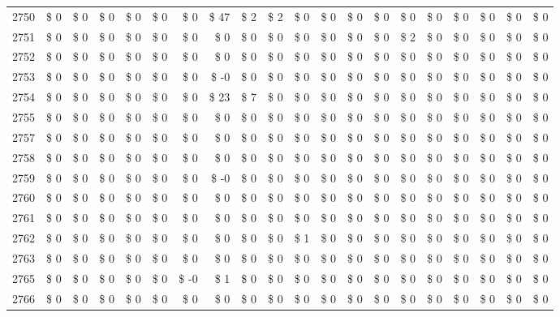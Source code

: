 \begin{longtable}{lrrrrrrrrrrrrrrrrrrr}
2750 & \$ 0 & \$ 0 & \$ 0 & \$ 0 & \$ 0 & \$ 0 & \$ 47 & \$ 2 & \$ 2 & \$ 0 & \$ 0 & \$ 0 & \$ 0 & \$ 0 & \$ 0 & \$ 0 & \$ 0 & \$ 0 & \$ 0 \\
2751 & \$ 0 & \$ 0 & \$ 0 & \$ 0 & \$ 0 & \$ 0 & \$ 0 & \$ 0 & \$ 0 & \$ 0 & \$ 0 & \$ 0 & \$ 0 & \$ 2 & \$ 0 & \$ 0 & \$ 0 & \$ 0 & \$ 0 \\
2752 & \$ 0 & \$ 0 & \$ 0 & \$ 0 & \$ 0 & \$ 0 & \$ 0 & \$ 0 & \$ 0 & \$ 0 & \$ 0 & \$ 0 & \$ 0 & \$ 0 & \$ 0 & \$ 0 & \$ 0 & \$ 0 & \$ 0 \\
2753 & \$ 0 & \$ 0 & \$ 0 & \$ 0 & \$ 0 & \$ 0 & \$ -0 & \$ 0 & \$ 0 & \$ 0 & \$ 0 & \$ 0 & \$ 0 & \$ 0 & \$ 0 & \$ 0 & \$ 0 & \$ 0 & \$ 0 \\
2754 & \$ 0 & \$ 0 & \$ 0 & \$ 0 & \$ 0 & \$ 0 & \$ 23 & \$ 7 & \$ 0 & \$ 0 & \$ 0 & \$ 0 & \$ 0 & \$ 0 & \$ 0 & \$ 0 & \$ 0 & \$ 0 & \$ 0 \\
2755 & \$ 0 & \$ 0 & \$ 0 & \$ 0 & \$ 0 & \$ 0 & \$ 0 & \$ 0 & \$ 0 & \$ 0 & \$ 0 & \$ 0 & \$ 0 & \$ 0 & \$ 0 & \$ 0 & \$ 0 & \$ 0 & \$ 0 \\
2757 & \$ 0 & \$ 0 & \$ 0 & \$ 0 & \$ 0 & \$ 0 & \$ 0 & \$ 0 & \$ 0 & \$ 0 & \$ 0 & \$ 0 & \$ 0 & \$ 0 & \$ 0 & \$ 0 & \$ 0 & \$ 0 & \$ 0 \\
2758 & \$ 0 & \$ 0 & \$ 0 & \$ 0 & \$ 0 & \$ 0 & \$ 0 & \$ 0 & \$ 0 & \$ 0 & \$ 0 & \$ 0 & \$ 0 & \$ 0 & \$ 0 & \$ 0 & \$ 0 & \$ 0 & \$ 0 \\
2759 & \$ 0 & \$ 0 & \$ 0 & \$ 0 & \$ 0 & \$ 0 & \$ -0 & \$ 0 & \$ 0 & \$ 0 & \$ 0 & \$ 0 & \$ 0 & \$ 0 & \$ 0 & \$ 0 & \$ 0 & \$ 0 & \$ 0 \\
2760 & \$ 0 & \$ 0 & \$ 0 & \$ 0 & \$ 0 & \$ 0 & \$ 0 & \$ 0 & \$ 0 & \$ 0 & \$ 0 & \$ 0 & \$ 0 & \$ 0 & \$ 0 & \$ 0 & \$ 0 & \$ 0 & \$ 0 \\
2761 & \$ 0 & \$ 0 & \$ 0 & \$ 0 & \$ 0 & \$ 0 & \$ 0 & \$ 0 & \$ 0 & \$ 0 & \$ 0 & \$ 0 & \$ 0 & \$ 0 & \$ 0 & \$ 0 & \$ 0 & \$ 0 & \$ 0 \\
2762 & \$ 0 & \$ 0 & \$ 0 & \$ 0 & \$ 0 & \$ 0 & \$ 0 & \$ 0 & \$ 0 & \$ 1 & \$ 0 & \$ 0 & \$ 0 & \$ 0 & \$ 0 & \$ 0 & \$ 0 & \$ 0 & \$ 0 \\
2763 & \$ 0 & \$ 0 & \$ 0 & \$ 0 & \$ 0 & \$ 0 & \$ 0 & \$ 0 & \$ 0 & \$ 0 & \$ 0 & \$ 0 & \$ 0 & \$ 0 & \$ 0 & \$ 0 & \$ 0 & \$ 0 & \$ 0 \\
2765 & \$ 0 & \$ 0 & \$ 0 & \$ 0 & \$ 0 & \$ -0 & \$ 1 & \$ 0 & \$ 0 & \$ 0 & \$ 0 & \$ 0 & \$ 0 & \$ 0 & \$ 0 & \$ 0 & \$ 0 & \$ 0 & \$ 0 \\
2766 & \$ 0 & \$ 0 & \$ 0 & \$ 0 & \$ 0 & \$ 0 & \$ 0 & \$ 0 & \$ 0 & \$ 0 & \$ 0 & \$ 0 & \$ 0 & \$ 0 & \$ 0 & \$ 0 & \$ 0 & \$ 0 & \$ 0 \\

\end{longtable}
